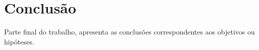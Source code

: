 \chapter{Conclusão}

Parte final do trabalho, apresenta as conclusões correspondentes aos objetivos
ou hipóteses.